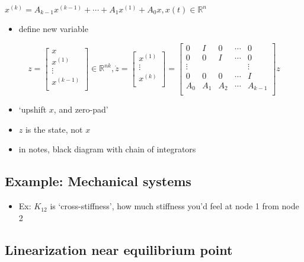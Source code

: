 \documentclass[10pt,letterpaper]{article}
\begin{document}
$x ^{(k)} = A _{k-1} x ^{(k-1)} + \cdots + A _{1} x ^{(1)} + A _{0} x, x(t) \in \mathbb{R}^{n}$
\begin{itemize}
\item define new variable
\end{itemize}
$$
z =
\begin{bmatrix}
  x          \\
  x ^{(1)}   \\
  \vdots     \\
  x ^{(k-1)} \\
\end{bmatrix}
\in \mathbb{R}^{nk},
\dot z =
\begin{bmatrix}
  x ^{(1)}   \\
  \vdots     \\
  x ^{(k)} \\
\end{bmatrix}
=
\begin{bmatrix}
       0 &   I &   0 & \cdots & 0        \\
       0 &   0 &   I & \cdots & 0        \\
  \vdots &     &     &        & \vdots   \\
       0 &   0 &   0 & \cdots & I        \\
     A_0 & A_1 & A_2 & \cdots & A _{k-1} \\
\end{bmatrix}
z
$$
\begin{itemize}
\item `upshift $x$, and zero-pad'
\item $z$ is the state, not $x$
\item in notes, black diagram with chain of integrators
\end{itemize}
\subsection{Example: Mechanical systems}
\label{sec-8_5}

\begin{itemize}
\item Ex: $K _{12}$ is `cross-stiffness', how much stiffness you'd feel at node 1 from node 2
\end{itemize}
\subsection{Linearization near equilibrium point}
\label{sec-8_6}
\end{document}
